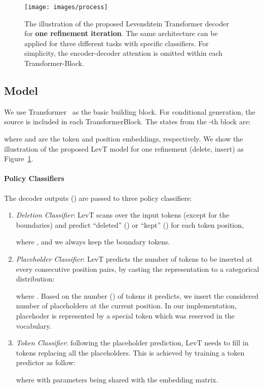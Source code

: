 \documentclass{article}
\begin{document}
\begin{figure}
    \centering
\texttt{[image: images/process]}
\caption{The illustration of the proposed Levenshtein Transformer decoder for \textbf{one refinement iteration}. The same architecture can be applied for three different tasks with specific classifiers. For simplicity, the encoder-decoder attention is omitted within each Transformer-Block.}
    \label{fig:process}
\end{figure}

\subsection{Model}
\label{sec:model}
We use Transformer~\citep{vaswani2017attention} as the basic building block. For conditional generation, the source  is included in each TransformerBlock. The states from the -th block are:

where  and  are the token and position embeddings, respectively. We show the illustration of the proposed LevT model for one refinement (delete, insert) as Figure~\ref{fig:process}. 

\paragraph{Policy Classifiers} The decoder outputs () are passed to three policy classifiers:


\begin{enumerate}[leftmargin=*]
    \item \textit{Deletion Classifier}: LevT scans over the input tokens (except for the boundaries) and predict ``deleted'' () or ``kept'' () for each token position, 
    
    where , and we always keep the boundary tokens.
\item \textit{Placeholder Classifier}: LevT predicts the number of tokens to be inserted at every consecutive position pairs, by casting the representation to a categorical distribution:
        
    where . Based on the number () of tokens it predicts, we insert the considered number of placeholders at the current position. In our implementation, placehoder is represented by a special token  which was reserved in the vocabulary.
\item \textit{Token Classifier}: following the placeholder prediction, LevT needs to fill in tokens replacing all the placeholders. This is achieved by training a token predictor as follow:
        
    where  with parameters being shared with the embedding matrix.
\end{enumerate}
\end{document}
